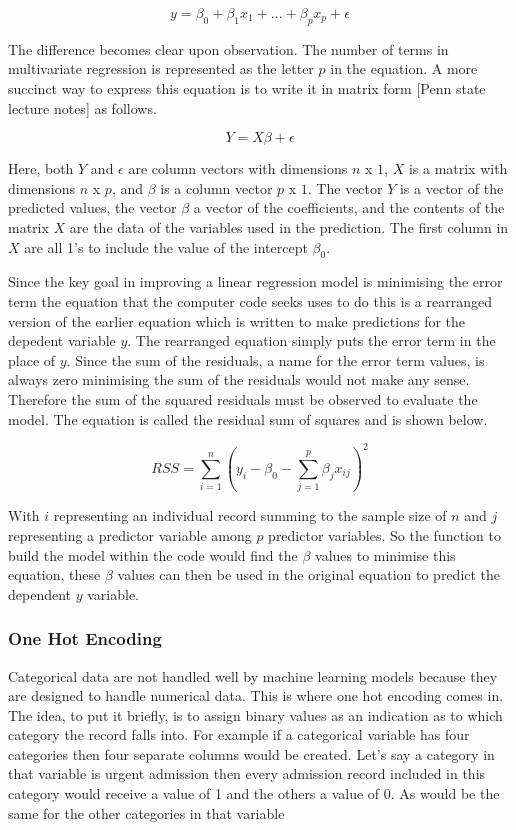 \documentclass[11pt]{article}
\begin{document}
\[y = \beta_0 + \beta_1x_1 + ... + \beta_px_p + \epsilon\]

The difference becomes clear upon observation. The number of terms in multivariate regression is represented as the letter \(p\) in the equation. A more succinct way to express this equation is to write it in matrix form [Penn state lecture notes] as follows.

\[Y = X\beta + \epsilon\]

Here, both \(Y\) and \(\epsilon\) are column vectors with dimensions \(n\) x \(1\), \(X\) is a matrix with dimensions \(n\) x \(p\), and \(\beta\) is a column vector \(p\) x \(1\). The vector \(Y\) is a vector of the predicted values, the vector \(\beta\) a vector of the coefficients, and the contents of the matrix \(X\) are the data of the variables used in the prediction. The first column in \(X\) are all 1's to include the value of the intercept \(\beta_0\).

Since the key goal in improving a linear regression model is minimising the error term the equation that the computer code seeks uses to do this is a rearranged version of the earlier equation which is written to make predictions for the depedent variable \(y\). The rearranged equation simply puts the error term in the place of \(y\).  Since the sum of the residuals, a name for the error term values, is always zero minimising the sum of the residuals would not make any sense. Therefore the sum of the squared residuals must be observed to evaluate the model.  The equation is called the residual sum of squares and is shown below.

\[RSS = \sum_{i=1}^{n}(y_i - \beta_0 - \sum_{j=1}^{p}\beta_jx_{ij})^2\]

With \(i\) representing an individual record summing to the sample size of \(n\) and \(j\) representing a predictor variable among \(p\) predictor variables. So the function to build the model within the code would find the  \(\beta\) values to minimise this equation, these \(\beta\) values can then be used in the original equation to predict the dependent \(y\) variable.

\subsubsection{One Hot Encoding}
Categorical data are not handled well by machine learning models because they are designed to handle numerical data. This is where one hot encoding comes in. The idea, to put it briefly, is to assign binary values as an indication as to which category the record falls into. For example if a categorical variable has four categories then four separate columns would be created. Let's say a category in that variable is urgent admission then every admission record included in this category would receive a value of 1 and the others a value of 0. As would be the same for the other categories in that variable
\end{document}
